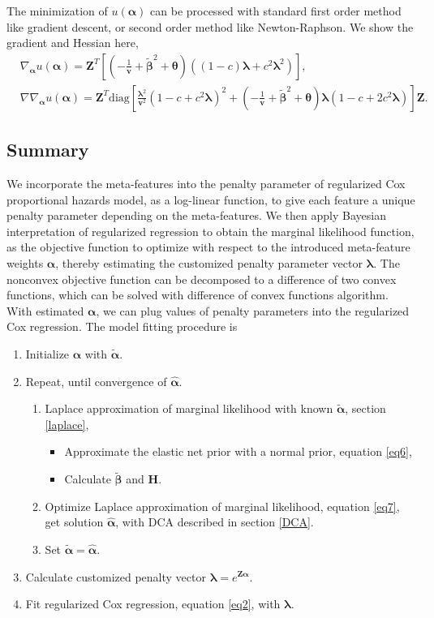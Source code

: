 The minimization of $u(\bm{\alpha})$ can be processed with standard first order method like gradient descent, or second order method like Newton-Raphson. We show the gradient and Hessian here,
\begin{align*}
    &\nabla_{\bm{\alpha}} u(\bm{\alpha}) = \bm{Z}^T\left[(-\frac{1}{\bm{v}}+\widetilde{\bm{\beta}}^2+\bm{\theta})((1-c)\bm{\lambda}+c^2\bm{\lambda}^2)\right],\\
    &\nabla\nabla_{\bm{\alpha}} u(\bm{\alpha}) = \bm{Z}^T \text{diag}\left[\frac{\bm{\lambda}^2}{\bm{v}^2}(1-c+c^2\bm{\lambda})^2+(-\frac{1}{\bm{v}}+\widetilde{\bm{\beta}}^2+\bm{\theta})\bm{\lambda}(1-c+2c^2\bm{\lambda})\right]\bm{Z}.
\end{align*}

\subsection{Summary}
We incorporate the meta-features into the penalty parameter of regularized Cox proportional hazards model, as a log-linear function, to give each feature a unique penalty parameter depending on the meta-features. We then apply Bayesian interpretation of regularized regression to obtain the marginal likelihood function, as the objective function to optimize with respect to the introduced meta-feature weights $\bm{\alpha}$, thereby estimating the customized penalty parameter vector $\bm{\lambda}$. The nonconvex objective function can be decomposed to a difference of two convex functions, which can be solved with difference of convex functions algorithm. With estimated $\bm{\alpha}$, we can plug values of penalty parameters into the regularized Cox regression. The model fitting procedure is
\begin{enumerate}
    \item Initialize $\bm{\alpha}$ with $\widetilde{\bm{\alpha}}$.
    \item Repeat, until convergence of $\hat{\bm{\alpha}}$.
    \begin{enumerate}
        \item Laplace approximation of marginal likelihood with known $\widetilde{\bm{\alpha}}$, section \ref{laplace},
        \begin{itemize}
            \item Approximate the elastic net prior with a normal prior, equation \eqref{eq6},
            \item Calculate $\widetilde{\bm{\beta}}$ and $\bm{H}$.
        \end{itemize}
        \item Optimize Laplace approximation of marginal likelihood, equation \eqref{eq7}, get solution $\hat{\bm{\alpha}}$, with DCA described in section \ref{DCA}.
        \item Set $\widetilde{\bm{\alpha}} = \hat{\bm{\alpha}}$.
    \end{enumerate}
    \item Calculate customized penalty vector $\bm{\lambda}=e^{\bm{Z}\hat{\bm{\alpha}}}$.
    \item Fit regularized Cox regression, equation \eqref{eq2}, with $\bm{\lambda}$.
    
\end{enumerate}

